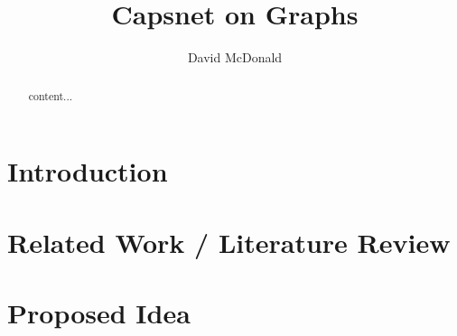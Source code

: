 \documentclass{article}
\title{Capsnet on Graphs}
\author{David McDonald}
\date{}
\begin{document}
	
	\maketitle
	
	\begin{abstract}
		content...
	\end{abstract}
	
	\section{Introduction}
	
	
	\section{Related Work / Literature Review}
	
	\section{Proposed Idea}
	
\end{document}
